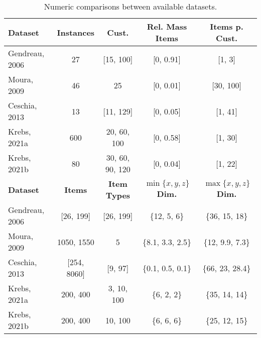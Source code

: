 \begin{table}[ht]
    \centering
    \small
    \begin{tabular}{@{}lcccc@{}}
        \toprule
        \textbf{Dataset} & \textbf{Instances} & \textbf{Cust.}      & \textbf{Rel. Mass Items}                 & \textbf{Items p. Cust.}                  \\
        \midrule
        Gendreau, 2006   & 27                 & [15, 100]           & [0, 0.91]                                & [1, 3]                                   \\
        Moura, 2009      & 46                 & 25                  & [0, 0.01]                                & [30, 100]                                \\
        Ceschia, 2013    & 13                 & [11, 129]           & [0, 0.05]                                & [1, 41]                                  \\
        Krebs, 2021a     & 600                & 20, 60, 100         & [0, 0.58]                                & [1, 30]                                  \\
        Krebs, 2021b     & 80                 & 30, 60, 90, 120     & [0, 0.04]                                & [1, 22]                                  \\
        \toprule
        \textbf{Dataset} & \textbf{Items}     & \textbf{Item Types} & \textbf{\boldmath$\min\{x, y, z\}$ Dim.} & \textbf{\boldmath$\max\{x, y, z\}$ Dim.} \\
        \midrule
        Gendreau, 2006   & [26, 199]          & [26, 199]           & \{12, 5, 6\}                             & \{36, 15, 18\}                           \\
        Moura, 2009      & 1050, 1550         & 5                   & \{8.1, 3.3, 2.5\}                        & \{12, 9.9, 7.3\}                         \\
        Ceschia, 2013    & [254, 8060]        & [9, 97]             & \{0.1, 0.5, 0.1\}                        & \{66, 23, 28.4\}                         \\
        Krebs, 2021a     & 200, 400           & 3, 10, 100          & \{6, 2, 2\}                              & \{35, 14, 14\}                           \\
        Krebs, 2021b     & 200, 400           & 10, 100             & \{6, 6, 6\}                              & \{25, 12, 15\}                           \\
        \bottomrule
    \end{tabular}
    \caption{Numeric comparisons between available datasets.}
    \label{tab:dataset_comparison}
\end{table}